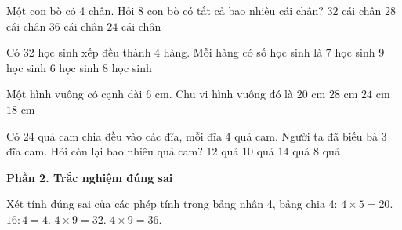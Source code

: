 \begin{ex} %
Một con bò có 4 chân. Hỏi 8 con bò có tất cả bao nhiêu cái chân?
\choice
{\True $32$ cái chân}
{$28$ cái chân}
{$36$ cái chân}
{$24$ cái chân}
\end{ex}

\begin{ex} %
Có 32 học sinh xếp đều thành 4 hàng. Mỗi hàng có số học sinh là
\choice
{$7$ học sinh}
{$9$ học sinh}
{$6$ học sinh}
{\True $8$ học sinh}
\end{ex}

\begin{ex} %
Một hình vuông có cạnh dài $6\text{ cm}$. Chu vi hình vuông đó là
\choice
{$20\text{ cm}$}
{$28\text{ cm}$}
{\True $24\text{ cm}$}
{$18\text{ cm}$}
\end{ex}

\begin{ex} %
Có 24 quả cam chia đều vào các đĩa, mỗi đĩa 4 quả cam. Người ta đã biếu bà 3 đĩa cam. Hỏi còn lại bao nhiêu quả cam?
\choice
{\True $12$ quả}
{$10$ quả}
{$14$ quả}
{$8$ quả}
\end{ex}

\textbf{Phần 2. Trắc nghiệm đúng sai}

\begin{ex} %
Xét tính đúng sai của các phép tính trong bảng nhân 4, bảng chia 4:
\choiceTF
{\True $4 \times 5 = 20$.}
{\True $16 : 4 = 4$.}
{$4 \times 9 = 32$.}
{\True $4 \times 9 = 36$.}
\end{ex}

